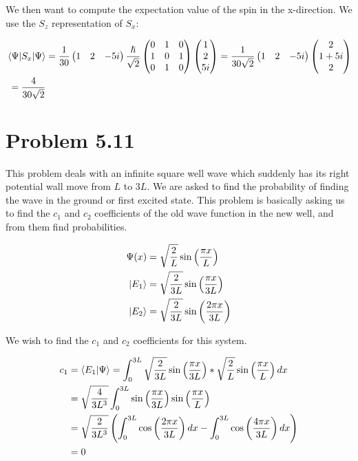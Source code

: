 \documentclass[10pt]{article} %
\begin{document}
We then want to compute the expectation value of the spin in the x-direction. We use the
$S_z$ representation of $S_x$:

\begin{align*}
  \expval{S_x}{\Psi} &= \frac{1}{30}\begin{pmatrix}1&2&-5i\end{pmatrix}\frac{\hslash}{\sqrt{2}}
    \begin{pmatrix}0&1&0\\1&0&1\\0&1&0\\\end{pmatrix}\begin{pmatrix}1\\2\\5i\end{pmatrix}
        = \frac{1}{30\sqrt{2}}\begin{pmatrix}1&2&-5i\end{pmatrix}
          \begin{pmatrix}2\\1+5i\\2\end{pmatrix}\\
            = \frac{4}{30\sqrt{2}}\\
\end{align*}

\section{Problem 5.11}
This problem deals with an infinite square well wave which suddenly has its right potential wall
move from $L$ to $3L$. We are asked to find the probability of finding the wave in the ground or
first excited state. This problem is basically asking us to find the $c_1$ and $c_2$ coefficients
of the old wave function in the new well, and from them find probabilities.

\begin{align*}
  \Psi(x) &= \sqrt{\frac{2}{L}}\sin\left(\frac{\pi x}{L}\right)\\
  \ket{E_1} &= \sqrt{\frac{2}{3L}}\sin\left(\frac{\pi x}{3L}\right)\\
  \ket{E_2} &= \sqrt{\frac{2}{3L}}\sin\left(\frac{2\pi x}{3L}\right)\\
\end{align*}

We wish to find the $c_1$ and $c_2$ coefficients for this system.

\begin{align*}
  c_1 &= \braket{E_1}{\Psi} = \int_0^{3L} \sqrt{\frac{2}{3L}}\sin\left(\frac{\pi x}{3L}\right)*
  \sqrt{\frac{2}{L}}\sin\left(\frac{\pi x}{L}\right)dx\\
  &= \sqrt{\frac{4}{3L^3}}\int_0^{3L}
  \sin\left(\frac{\pi x}{3L}\right)\sin\left(\frac{\pi x}{L}\right)\\
  &= \sqrt{\frac{2}{3L^3}}\left(\int_0^{3L} \cos\left(\frac{2\pi x}{3L}\right)dx
  - \int_0^{3L} \cos\left(\frac{4\pi x}{3L}\right)dx\right)\\
  &= 0\\
\end{align*}
\end{document}
